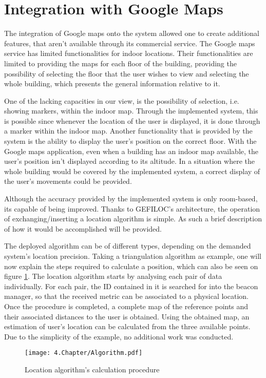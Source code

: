 \section{Integration with Google Maps} 
\label{sec:gmaps} 
 
 
The integration of Google maps onto the system allowed one to create additional features, that aren't available through its commercial service. The Google maps service has limited functionalities for indoor locations. Their functionalities are limited to providing the maps for each floor of the building, providing the possibility of selecting the floor that the user wishes to view and selecting the whole building, which presents the general information relative to it.  
 
 
One of the lacking capacities in our view, is the possibility of selection, i.e. showing markers, within the indoor map. Through the implemented system, this is possible since whenever the location of the user is displayed, it is done through a marker within the indoor map. Another functionality that is provided by the system is the ability to display the user's position on the correct floor. With the Google maps application, even when a building has an indoor map available, the user's position isn't displayed according to its altitude. In a situation where the whole building would be covered by the implemented system, a correct display of the user's movements could be provided. 
 
 
Although the accuracy provided by the implemented system is only room-based, its capable of being improved. Thanks to GEFILOC's architecture, the operation of exchanging/inserting a location algorithm is simple. As such a brief description of how it would be accomplished will be provided. 
 
 
The deployed algorithm can be of different types, depending on the demanded system's location precision. Taking a triangulation algorithm as example, one will now explain the steps required to calculate a position, which can also be seen on figure \ref{fig:algo}. The location algorithm starts by analysing each pair of data individually. For each pair, the ID contained in it is searched for into the beacon manager, so that the received metric can be associated to a physical location. Once the procedure is completed, a complete map of the reference points and their associated distances to the user is obtained. Using the obtained map, an estimation of user's location can be calculated from the three available points. Due to the simplicity of the example, no additional work was conducted. 
 
 
\begin{figure}[H] 
\centering 
\texttt{[image: 4.Chapter/Algorithm.pdf]} 
\caption[Location algorithm's calculation procedure]{Location algorithm's calculation procedure} 
\label{fig:algo} 
\end{figure} 
 